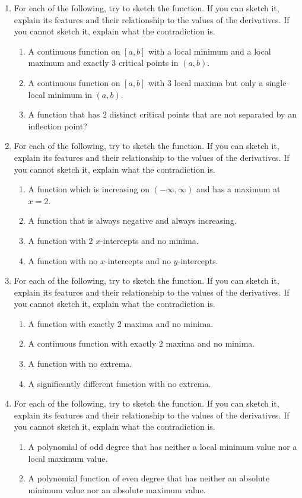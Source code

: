 \begin{enumerate}
\item  For each of the following, try to sketch the function.  If you can sketch it, explain its features and their relationship to the values of the derivatives.  If you cannot sketch it, explain what the contradiction is.
\begin{enumerate}
\item A continuous function on $[a, b]$ with a local minimum and a local maximum and exactly 3 critical points in $(a, b)$.		
\item A continuous function on $[a, b]$ with 3 local maxima but only a single local minimum in $(a, b)$.
\item A function that has 2 distinct critical points that are not separated by an inflection point?  \cite{EP}  \end{enumerate}

\item  For each of the following, try to sketch the function.  If you can sketch it, explain its features and their relationship to the values of the derivatives.  If you cannot sketch it, explain what the contradiction is.
\begin{enumerate}
\item A function which is increasing on $(-\infty, \infty)$ and has a maximum at $x = 2$.		
\item A function that is always negative and always increasing.
\item A function with 2 $x$-intercepts and no minima. 	
\item A function with no $x$-intercepts and no $y$-intercepts. \end{enumerate}

\item  For each of the following, try to sketch the function.  If you can sketch it, explain its features and their relationship to the values of the derivatives.  If you cannot sketch it, explain what the contradiction is.
\begin{enumerate}\item A function with exactly 2 maxima and no minima.	
\item A continuous function with exactly 2 maxima and no minima.
\item A function with no extrema.	
\item A significantly different function with no extrema. \end{enumerate}

\item  For each of the following, try to sketch the function.  If you can sketch it, explain its features and their relationship to the values of the derivatives.  If you cannot sketch it, explain what the contradiction is.
\begin{enumerate}\item A polynomial of odd degree that has neither a local minimum value nor a local maximum value. 	
\item A polynomial function of even degree that has neither an absolute minimum value nor an absolute maximum value.  \cite{EP} \end{enumerate}


\end{enumerate}
